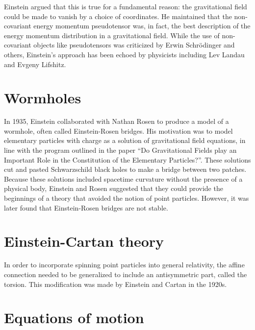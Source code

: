 \documentclass[twoside]{memoir}
\begin{document}
Einstein argued that this is true for a fundamental reason: the gravitational field could be made to vanish by a choice of coordinates. He maintained that the non-covariant energy momentum pseudotensor was, in fact, the best description of the energy momentum distribution in a gravitational field. While the use of non-covariant objects like pseudotensors was criticized by Erwin Schrödinger and others, Einstein's approach has been echoed by physicists including Lev Landau and Evgeny Lifshitz.\cite{Goldberg_1958}

\section{Wormholes}\label{wormholes}

In 1935, Einstein collaborated with Nathan Rosen to produce a model of a wormhole, often called Einstein-Rosen bridges.\cite{QNjpt} His motivation was to model elementary particles with charge as a solution of gravitational field equations, in line with the program outlined in the paper \enquote{Do Gravitational Fields play an Important Role in the Constitution of the Elementary Particles?}. These solutions cut and pasted Schwarzschild black holes to make a bridge between two patches. Because these solutions included spacetime curvature without the presence of a physical body, Einstein and Rosen suggested that they could provide the beginnings of a theory that avoided the notion of point particles. However, it was later found that Einstein-Rosen bridges are not stable.\cite{ja7FY}

\section{Einstein-Cartan theory}\label{einstein-cartan-theory}

In order to incorporate spinning point particles into general relativity, the affine connection needed to be generalized to include an antisymmetric part, called the torsion. This modification was made by Einstein and Cartan in the 1920s.

\section{Equations of motion}\label{equations-of-motion}
\end{document}
